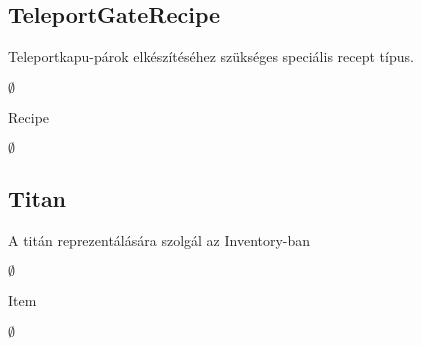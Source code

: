 \subsection{TeleportGateRecipe}
\begin{class-template-responsibility}
Teleportkapu-párok elkészítéséhez szükséges speciális recept típus. 
\end{class-template-responsibility}
\begin{class-template-interface}
$\emptyset$
\end{class-template-interface}
\begin{class-template-baseclass}
Recipe
\end{class-template-baseclass}
\begin{class-template-attribute}
\end{class-template-attribute}
\begin{class-template-method}
\item[] $\emptyset$
\end{class-template-method}


\subsection{Titan}
\begin{class-template-responsibility}
A titán reprezentálására szolgál az Inventory-ban
\end{class-template-responsibility}
\begin{class-template-interface}
$\emptyset$
\end{class-template-interface}
\begin{class-template-baseclass}
Item
\end{class-template-baseclass}
\begin{class-template-attribute}
\item[] $\emptyset$
\end{class-template-attribute}
\begin{class-template-method}
\end{class-template-method}


